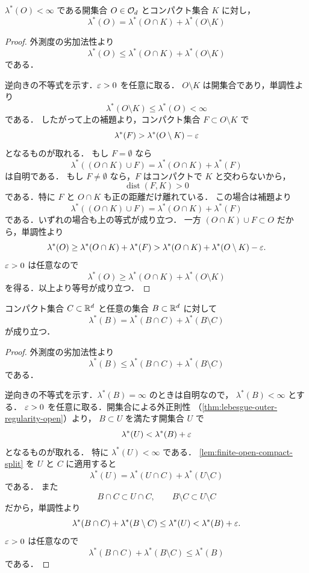 \begin{lemma} \label{lem:finite-open-compact-split}
    $\lambda^*(O)<\infty$ である開集合 $O \in \mathcal O_d$ とコンパクト集合 $K$ に対し，
    \[
    \lambda^*(O) = \lambda^*(O \cap K) + \lambda^*(O \setminus K)
    \]
\end{lemma}
\begin{proof}
外測度の劣加法性より
\[
\lambda^*(O)
\le
\lambda^*(O\cap K)+\lambda^*(O\setminus K)
\]
である．

逆向きの不等式を示す．$\varepsilon>0$ を任意に取る．
$O\setminus K$ は開集合であり，単調性より
\[
\lambda^*(O\setminus K)\le\lambda^*(O)<\infty
\]
である．
したがって上の補題より，コンパクト集合 $F\subset O\setminus K$ で
\[
\lambda^*(F)>\lambda^*(O\setminus K)-\varepsilon
\]
となるものが取れる．
もし $F=\emptyset$ なら
\[
\lambda^*((O\cap K)\cup F)
=
\lambda^*(O\cap K)+\lambda^*(F)
\]
は自明である．
もし $F\neq\emptyset$ なら，$F$ はコンパクトで $K$ と交わらないから，
\[
\operatorname{dist}(F,K)>0
\]
である．特に $F$ と $O\cap K$ も正の距離だけ離れている．
この場合は補題より
\[
\lambda^*((O\cap K)\cup F)
=
\lambda^*(O\cap K)+\lambda^*(F)
\]
である．いずれの場合も上の等式が成り立つ．
一方 $(O\cap K)\cup F\subset O$ だから，単調性より
\[
\lambda^*(O)
\ge
\lambda^*(O\cap K)+\lambda^*(F)
>
\lambda^*(O\cap K)+\lambda^*(O\setminus K)-\varepsilon.
\]
$\varepsilon>0$ は任意なので
\[
\lambda^*(O)
\ge
\lambda^*(O\cap K)+\lambda^*(O\setminus K)
\]
を得る．以上より等号が成り立つ．
\end{proof}

\begin{lemma}[コンパクト集合による外測度の分解]\label{lem:compact-splits-outer-measure}
コンパクト集合 $C\subset\mathbb R^d$ と任意の集合 $B\subset\mathbb R^d$ に対して
\[
\lambda^*(B)
=
\lambda^*(B\cap C)+\lambda^*(B\setminus C)
\]
が成り立つ．
\end{lemma}
\begin{proof}
外測度の劣加法性より
\[
\lambda^*(B)
\le
\lambda^*(B\cap C)+\lambda^*(B\setminus C)
\]
である．

逆向きの不等式を示す．$\lambda^*(B)=\infty$ のときは自明なので，
$\lambda^*(B)<\infty$ とする．
$\varepsilon>0$ を任意に取る．開集合による外正則性
（\cref{thm:lebesgue-outer-regularity-open}）より，
$B\subset U$ を満たす開集合 $U$ で
\[
\lambda^*(U)<\lambda^*(B)+\varepsilon
\]
となるものが取れる．
特に $\lambda^*(U)<\infty$ である．
\cref{lem:finite-open-compact-split} を $U$ と $C$ に適用すると
\[
\lambda^*(U)
=
\lambda^*(U\cap C)+\lambda^*(U\setminus C)
\]
である．
また
\[
B\cap C\subset U\cap C,\qquad B\setminus C\subset U\setminus C
\]
だから，単調性より
\[
\lambda^*(B\cap C)+\lambda^*(B\setminus C)
\le
\lambda^*(U)
<
\lambda^*(B)+\varepsilon.
\]
$\varepsilon>0$ は任意なので
\[
\lambda^*(B\cap C)+\lambda^*(B\setminus C)
\le
\lambda^*(B)
\]
である．
\end{proof}


